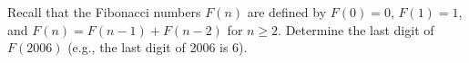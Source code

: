 Recall that the Fibonacci numbers $F(n)$ are defined by $F(0) = 0$, $F(1) = 1$,
and $F(n) = F(n - 1) + F(n - 2)$ for $n \ge 2$. Determine the last digit of
$F(2006)$ (e.g., the last digit of 2006 is 6).
